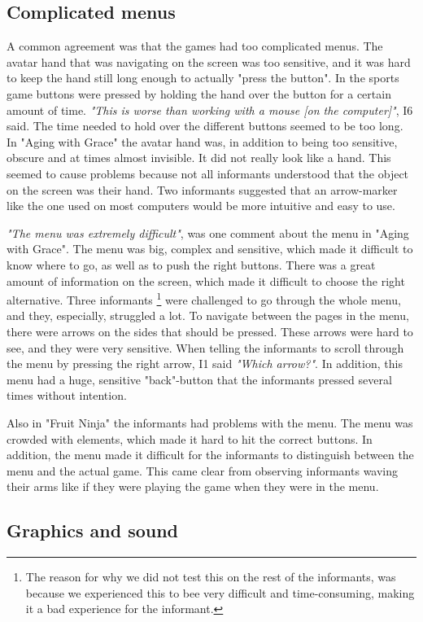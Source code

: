 \subsection{Complicated menus}
A common agreement was that the games had too complicated menus.  The avatar hand that was navigating on the screen was too sensitive, and it was hard to keep the hand still long enough to actually "press the button". In the sports game buttons were pressed by holding the hand over the button for a certain amount of time. \emph{"This is worse than working with a mouse [on the computer]"}, I6 said. The time needed to hold over the different buttons seemed to be too long. In "Aging with Grace" the avatar hand was, in addition to being too sensitive, obscure and at times almost invisible. It did not really look like a hand. This seemed to cause problems because not all informants understood that the object on the screen was their hand. Two informants suggested that an arrow-marker like the one used on most computers would be more intuitive and easy to use. 

\emph{"The menu was extremely difficult"}, was one comment about the menu in "Aging with Grace". The menu was big, complex and sensitive, which made it difficult to know where to go, as well as to push the right buttons. There was a great amount of information on the screen, which made it difficult to choose the right alternative. Three informants \footnote{The reason for why we did not test this on the rest of the informants, was because we experienced this to bee very difficult and time-consuming, making it a bad experience for the informant.} were challenged to go through the whole menu, and they, especially, struggled a lot. To navigate between the pages in the menu, there were arrows on the sides that should be pressed. These arrows were hard to see, and they were very sensitive. When telling the informants to scroll through the menu by pressing the right arrow, I1 said \emph{"Which arrow?"}. In addition, this menu had a huge, sensitive "back"-button that the informants pressed several times without intention. 

Also in "Fruit Ninja" the informants had problems with the menu. The menu was crowded with elements, which made it hard to hit the correct buttons. In addition, the menu made it difficult for the informants to distinguish between the menu and the actual game. This came clear from observing informants waving their arms like if they were playing the game when they were in the menu. 

\subsection{Graphics and sound}

